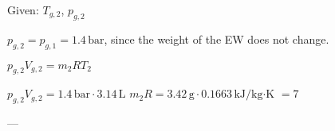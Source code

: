 Given: \( T_{g,2} \), \( p_{g,2} \)  

\( p_{g,2} = p_{g,1} = 1.4 \, \text{bar} \), since the weight of the EW does not change.  

\( p_{g,2} V_{g,2} = m_2 R T_{2} \)  

\( p_{g,2} V_{g,2} = 1.4 \, \text{bar} \cdot 3.14 \, \text{L} \)  
\( m_2 R = 3.42 \, \text{g} \cdot 0.1663 \, \text{kJ/kg·K} \)  
\( = 7 \)  

---
